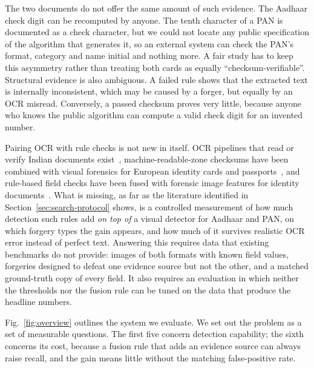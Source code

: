 \documentclass[conference]{IEEEtran}
\begin{document}
The two documents do not offer the same amount of such evidence. The
Aadhaar check digit can be recomputed by anyone. The tenth character of
a PAN is documented as a check character, but we could not locate any
public specification of the algorithm that generates it, so an external
system can check the PAN's format, category and name initial and
nothing more. A fair study has to keep
this asymmetry rather than treating both cards as equally
``checksum-verifiable''. Structural evidence is also ambiguous. A
failed rule shows that the extracted text is internally inconsistent,
which may be caused by a forger, but equally by an OCR misread.
Conversely, a passed checksum proves very little, because anyone who
knows the public algorithm can compute a valid check digit for an
invented number.

Pairing OCR with rule checks is not new in itself.
OCR pipelines that read or verify Indian documents
exist~\cite{raghuvanshi,panens}, machine-readable-zone checksums have
been combined with visual forensics for European identity cards and
passports~\cite{dai}, and rule-based field checks have been fused with
forensic image features for identity documents~\cite{limconnie}. What is
missing, as far as the literature identified in
Section~\ref{sec:search-protocol} shows, is a controlled measurement of
how much detection such rules add \emph{on top of} a visual detector for
Aadhaar and PAN, on which forgery types the gain appears, and how much
of it survives realistic OCR error instead of perfect text. Answering
this requires data that existing benchmarks do not provide: images of
both formats with known field values, forgeries designed to defeat one
evidence source but not the other, and a matched ground-truth copy of
every field. It also requires an evaluation in which neither the
thresholds nor the fusion rule can be tuned on the data that produce
the headline numbers.

Fig.~\ref{fig:overview} outlines the system we evaluate. We set out
the problem as a set of measurable questions. The
first five concern detection capability; the sixth concerns its cost,
because a fusion rule that adds an evidence source can always raise
recall, and the gain means little without the matching false-positive
rate.
\end{document}
